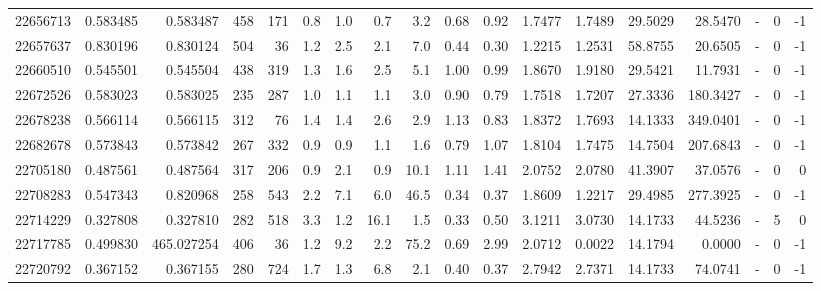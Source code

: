 \begin{tabular}{rrrrrrrrrrrrrrrlrr}
  22656713 & 0.583485 &   0.583487 &  458 &  171 &      0.8 &      1.0 &     0.7 &      3.2 &       0.68 &        0.92 &  1.7477 &  1.7489 &   29.5029 &   28.5470 &             - &        0 &         -1 \\
  22657637 & 0.830196 &   0.830124 &  504 &   36 &      1.2 &      2.5 &     2.1 &      7.0 &       0.44 &        0.30 &  1.2215 &  1.2531 &   58.8755 &   20.6505 &             - &        0 &         -1 \\
  22660510 & 0.545501 &   0.545504 &  438 &  319 &      1.3 &      1.6 &     2.5 &      5.1 &       1.00 &        0.99 &  1.8670 &  1.9180 &   29.5421 &   11.7931 &             - &        0 &         -1 \\
  22672526 & 0.583023 &   0.583025 &  235 &  287 &      1.0 &      1.1 &     1.1 &      3.0 &       0.90 &        0.79 &  1.7518 &  1.7207 &   27.3336 &  180.3427 &             - &        0 &         -1 \\
  22678238 & 0.566114 &   0.566115 &  312 &   76 &      1.4 &      1.4 &     2.6 &      2.9 &       1.13 &        0.83 &  1.8372 &  1.7693 &   14.1333 &  349.0401 &             - &        0 &         -1 \\
  22682678 & 0.573843 &   0.573842 &  267 &  332 &      0.9 &      0.9 &     1.1 &      1.6 &       0.79 &        1.07 &  1.8104 &  1.7475 &   14.7504 &  207.6843 &             - &        0 &         -1 \\
  22705180 & 0.487561 &   0.487564 &  317 &  206 &      0.9 &      2.1 &     0.9 &     10.1 &       1.11 &        1.41 &  2.0752 &  2.0780 &   41.3907 &   37.0576 &             - &        0 &          0 \\
  22708283 & 0.547343 &   0.820968 &  258 &  543 &      2.2 &      7.1 &     6.0 &     46.5 &       0.34 &        0.37 &  1.8609 &  1.2217 &   29.4985 &  277.3925 &             - &        0 &         -1 \\
  22714229 & 0.327808 &   0.327810 &  282 &  518 &      3.3 &      1.2 &    16.1 &      1.5 &       0.33 &        0.50 &  3.1211 &  3.0730 &   14.1733 &   44.5236 &             - &        5 &          0 \\
  22717785 & 0.499830 & 465.027254 &  406 &   36 &      1.2 &      9.2 &     2.2 &     75.2 &       0.69 &        2.99 &  2.0712 &  0.0022 &   14.1794 &    0.0000 &             - &        0 &         -1 \\
  22720792 & 0.367152 &   0.367155 &  280 &  724 &      1.7 &      1.3 &     6.8 &      2.1 &       0.40 &        0.37 &  2.7942 &  2.7371 &   14.1733 &   74.0741 &             - &        0 &         -1 \\

\end{tabular}
